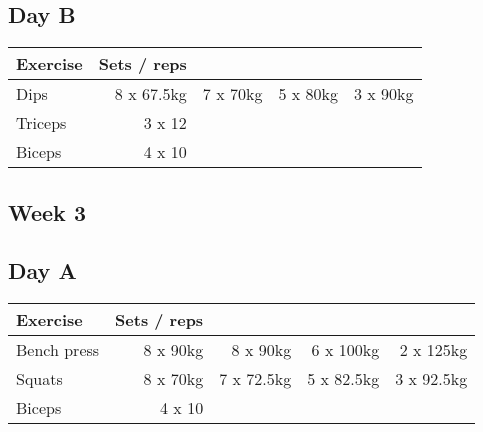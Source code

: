\documentclass[12pt, a4paper]{article}%
\begin{document}
  \subsection*{\hspace{0.5em} Day B }


  \begin{tabular}{l|rrrr}
  \hspace{0.75em} \textbf{Exercise} & \textbf{Sets / reps} \\ \hline

            \hspace{0.75em} Dips
            & 8 x 67.5kg
            & 7 x 70kg
            & 5 x 80kg
            & 3 x 90kg
            \\


   \hspace{0.75em} Triceps & 3 x 12 \\
   \hspace{0.75em} Biceps & 4 x 10 \\
  \end{tabular}

 \subsection*{\hspace{0.25em} Week 3 }
  \subsection*{\hspace{0.5em} Day A }


  \begin{tabular}{l|rrrr}
  \hspace{0.75em} \textbf{Exercise} & \textbf{Sets / reps} \\ \hline

            \hspace{0.75em} Bench press
            & 8 x 90kg
            & 8 x 90kg
            & 6 x 100kg
            & 2 x 125kg
            \\


            \hspace{0.75em} Squats
            & 8 x 70kg
            & 7 x 72.5kg
            & 5 x 82.5kg
            & 3 x 92.5kg
            \\


   \hspace{0.75em} Biceps & 4 x 10 \\
  \end{tabular}
\end{document}
